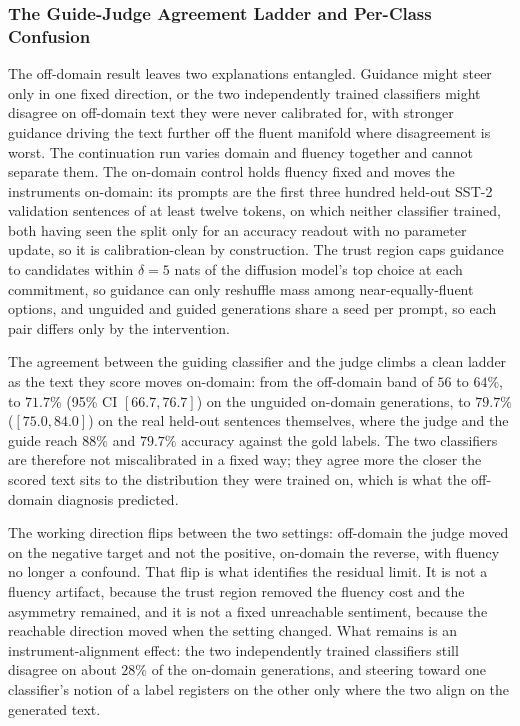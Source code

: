 \subsubsection{The Guide-Judge Agreement Ladder and Per-Class Confusion}
\label{app:guided-ladder}
\label{app:guided-confusion}

The off-domain result leaves two explanations entangled. Guidance might steer only in one
fixed direction, or the two independently trained classifiers might disagree on off-domain
text they were never calibrated for, with stronger guidance driving the text further off the
fluent manifold where disagreement is worst. The continuation run varies domain and fluency
together and cannot separate them. The on-domain control holds fluency fixed and moves the
instruments on-domain: its prompts are the first three hundred held-out SST-2 validation
sentences of at least twelve tokens, on which neither classifier trained, both having seen the
split only for an accuracy readout with no parameter update, so it is calibration-clean by
construction. The trust region caps guidance to candidates within $\delta=5$ nats of the
diffusion model's top choice at each commitment, so guidance can only reshuffle mass among
near-equally-fluent options, and unguided and guided generations share a seed per prompt, so
each pair differs only by the intervention.

The agreement between the guiding classifier and the judge climbs a clean ladder as the text
they score moves on-domain: from the off-domain band of $56$ to $64\%$, to $71.7\%$
(95\% CI $[66.7, 76.7]$) on the unguided on-domain generations, to $79.7\%$
($[75.0, 84.0]$) on the real held-out sentences themselves, where the judge and the guide
reach $88\%$ and $79.7\%$ accuracy against the gold labels.
The two classifiers are therefore not miscalibrated in a fixed way; they agree more the closer
the scored text sits to the distribution they were trained on, which is what the off-domain
diagnosis predicted.

The working direction flips between the two settings: off-domain the judge moved on the
negative target and not the positive, on-domain the reverse, with fluency no longer a
confound. That flip is what identifies the residual limit. It is not a fluency artifact,
because the trust region removed the fluency cost and the asymmetry remained, and it is not a
fixed unreachable sentiment, because the reachable direction moved when the setting changed.
What remains is an instrument-alignment effect: the two independently trained classifiers
still disagree on about $28\%$ of the on-domain generations, and steering toward one
classifier's notion of a label registers on the other only where the two align on the
generated text.

